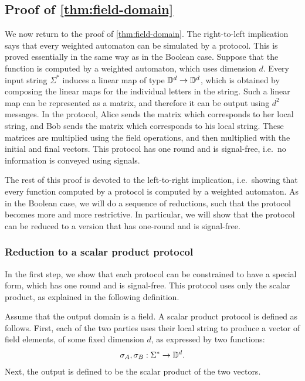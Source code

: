 \subsection{Proof of \cref{thm:field-domain}}
\label{sec:proof-of-thm-field-domain}
We now return to the proof of \cref{thm:field-domain}. The right-to-left implication says that every weighted automaton can be simulated by a protocol. This is proved essentially in the same way as in the Boolean case. Suppose that the function is computed by a weighted automaton, which uses  dimension $d$. Every input string $\Sigma^*$ induces a linear map of type $\mathbb D^d \to \mathbb D^d$, which is obtained by composing the linear maps for the individual letters in the string.  Such a linear map can be represented as a matrix, and therefore it can be output using $d^2$ messages.  In the protocol, Alice sends the matrix  which corresponds to her local string, and Bob sends the  matrix which corresponds to  his local string. These matrices are multiplied using the field operations, and then multiplied with the initial and final vectors. This protocol has one round and is signal-free, i.e.~no information is conveyed using signals.

The rest of this proof is devoted to the left-to-right implication, i.e.~showing that every function computed by a protocol is computed by a weighted automaton. As in the Boolean case, we will do a sequence of reductions, such that the protocol becomes more and more restrictive. In particular, we will show that the protocol can be reduced to a version that has one-round and  is signal-free.

\subsubsection{Reduction to a scalar product protocol}
\label{sec:reduction-to-scalar-product-protocols}

In the first step, we show that each protocol can be constrained to have a special form, which has one round and is signal-free. This protocol uses only the scalar product,  as explained in the following definition. 
\begin{definition} \label{def:scalar-product-protocol}
    Assume that the output domain is a field.
    A scalar product protocol is defined as follows. First, each of the two parties uses their local string to  produce a vector of field elements, of some fixed dimension $d$, as expressed by two functions: 
    \begin{align*}
    \sigma_A, \sigma_B : \Sigma^* \to \mathbb D^d.
    \end{align*}
    Next, the output is defined to be the scalar product of the two vectors. 
\end{definition}

